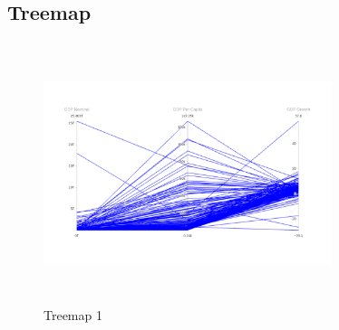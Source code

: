\documentclass[conference]{IEEEtran}
\begin{document}
\subsection{Treemap}
\begin{figure}
\centering
    \includegraphics[height=3in, width=0.75\textwidth]{images_ashish/pcp_1.png}
    \caption{Treemap 1}
    \label{fig_1}
\end{figure}
\end{document}
